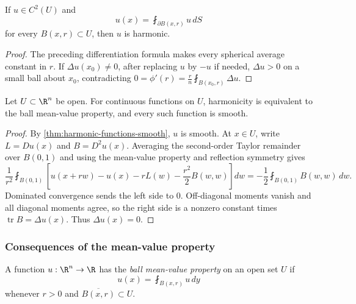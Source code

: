 \begin{theorem}
\label{thm:converse-mean-value-property-laplace}
\leanok
{}
If $u\in C^2(U)$ and
$$u(x)=\fint_{\partial B(x,r)}u\,dS$$
for every $B(x,r)\subset U$, then $u$ is harmonic.
\end{theorem}
\begin{proof}
\leanok
\sketch The preceding differentiation formula makes every spherical average
constant in $r$. If $\Delta u(x_0)\ne0$, after replacing $u$ by $-u$ if needed,
$\Delta u>0$ on a small ball about $x_0$, contradicting
$0=\phi'(r)=\frac r n\fint_{B(x_0,r)}\Delta u$.
\end{proof}

\begin{theorem}
\label{thm:converse-mean-value-property-mvp}
\leanok
Let $U\subset\R^n$ be open. For continuous functions on $U$, harmonicity is
equivalent to the ball mean-value property, and every such function is smooth.
\end{theorem}
\begin{proof}
\leanok
\sketch By \cref{thm:harmonic-functions-smooth}, $u$ is smooth. At $x\in U$,
write $L=Du(x)$ and $B=D^2u(x)$. Averaging the second-order Taylor remainder
over $B(0,1)$ and using the mean-value property and reflection symmetry gives
$$\frac1{r^2}\fint_{B(0,1)}
\left[u(x+rw)-u(x)-rL(w)-\frac{r^2}{2}B(w,w)\right]dw
=-\frac12\fint_{B(0,1)}B(w,w)\,dw.$$
Dominated convergence sends the left side to $0$. Off-diagonal moments vanish
and all diagonal moments agree, so the right side is a nonzero constant times
$\operatorname{tr}B=\Delta u(x)$. Thus $\Delta u(x)=0$.
\end{proof}

\subsubsection{Consequences of the mean-value property}
\label{sec:laplace-mean-value-consequences}

\begin{definition}
\label{def:ball-mean-value-property}
\leanok
A function $u:\R^n\to\R$ has the \emph{ball mean-value property} on an open
set $U$ if
$$u(x)=\fint_{B(x,r)}u\,dy$$
whenever $r>0$ and $\overline{B(x,r)}\subset U$.
\end{definition}

